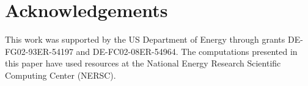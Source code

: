 \documentclass{article}
\begin{document}
\section{Acknowledgements}

This work was supported by the US Department of Energy through grants DE-FG02-93ER-54197 and DE-FC02-08ER-54964. The computations presented in this paper have used resources at the National Energy Research Scientific Computing Center (NERSC). 


\small

\end{document}
